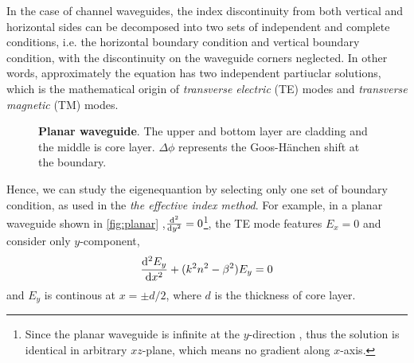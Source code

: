\documentclass[final]{kuee_en}
\begin{document}
In the case of channel waveguides, the index discontinuity from both vertical and horizontal sides can be decomposed into two sets of independent and complete conditions, i.e. the horizontal boundary condition and vertical boundary condition, with the discontinuity on the waveguide corners neglected. In other words, approximately the equation has two independent partiuclar solutions, which is the mathematical origin of \textit{ transverse electric} (TE) modes and \textit{transverse magnetic} (TM) modes.

\begin{figure}
\centering
{}
\caption{\textbf{Planar waveguide}. The upper and bottom layer are cladding and the middle is core layer. $\Delta \phi$ represents the Goos-H\"{a}nchen shift at the boundary.}
\label{fig:planar}
\end{figure}

Hence, we can study the eigenequantion by selecting only one set of boundary condition, as used in the \textit{the effective index method}. For example, in a planar waveguide shown in \autoref{fig:planar} ,$\dv[2]{}{y}=0$\footnote{Since the planar waveguide is infinite at the $y$-direction , thus the solution is identical in arbitrary $xz$-plane, which means no gradient along $x$-axis.},
the TE mode features $E_x=0$ and consider only $y$-component, 
\begin{equation}
    \dv[2]{E_y}{x} + (k^2 n^2 - \beta^2)E_y =0
\end{equation}
and $E_y$ is continous at $x=\pm d/2$, where $d$ is the thickness of core layer.
\end{document}
